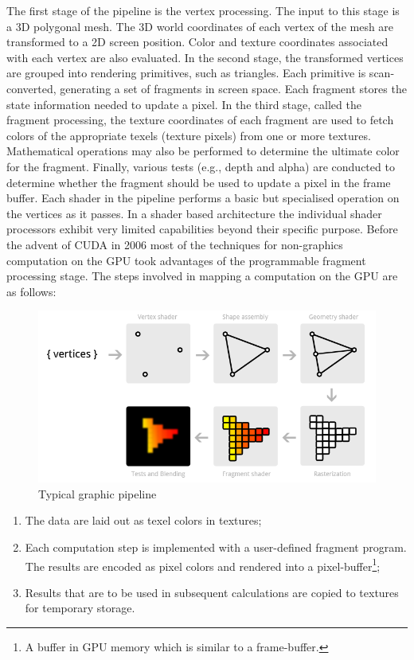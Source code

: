 The first stage of the pipeline is the vertex processing. The
input to this stage is a 3D polygonal mesh. The 3D world coordinates of each vertex of the mesh
are transformed to a 2D screen position. Color and texture
coordinates associated with each vertex are also evaluated.
In the second stage, the transformed vertices are grouped
into rendering primitives, such as triangles. Each primitive
is scan-converted, generating a set of fragments in screen
space. Each fragment stores the state information needed
to update a pixel. In the third stage, called the fragment processing, the texture coordinates of each fragment are used
to fetch colors of the appropriate texels (texture pixels) from
one or more textures. Mathematical operations may also be
performed to determine the ultimate color for the fragment.
Finally, various tests (e.g., depth and alpha) are conducted to
determine whether the fragment should be used to update a
pixel in the frame buffer.
Each shader in the pipeline performs a basic but specialised operation on the
vertices as it passes.
In a shader based architecture the individual shader processors exhibit very limited
capabilities beyond their specific purpose.
Before the advent of CUDA in 2006 most of the techniques for non-graphics
computation on the GPU took advantages of the programmable fragment processing
stage. The steps involved in mapping a computation on the GPU are
as follows:
\begin{figure}
\centering
\caption{Typical graphic pipeline}\label{graphicPipeline}
\includegraphics[scale=0.6]{./images/pipeline}
\end{figure}

\begin{enumerate}
	\item The data are laid out as texel colors in textures;
	\item  Each computation step is implemented with a
			user-defined fragment program. The results are encoded as pixel 
			colors and rendered into a pixel-buffer\footnote{ A buffer in GPU memory
			which is similar to a frame-buffer.}; 
	\item Results that are
			to be used in subsequent calculations are copied to textures for temporary
		storage.
\end{enumerate} 

